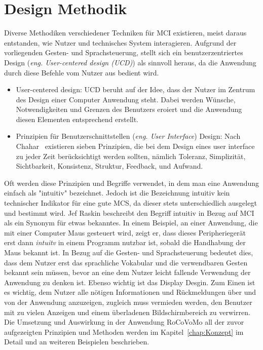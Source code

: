 \section{Design Methodik}
Diverse Methodiken verschiedener Techniken f\"ur \gls{MCI} existieren, meist daraus entstanden, wie Nutzer und technisches System interagieren. Aufgrund der vorliegenden Gesten- und Sprachsteuerung, stellt sich ein benutzerzentriertes Design (\textit{eng. User-centered design (UCD)}) als sinnvoll heraus, da die Anwendung durch diese Befehle vom Nutzer aus bedient wird.
\begin{itemize}
\item User-centered design: UCD beruht auf der Idee, dass der Nutzer im Zentrum des Design einer Computer Anwendung steht. Dabei werden W\"unsche, Notwendigkeiten und Grenzen des Benutzers eroiert und die Anwendung diesen Elementen entsprechend erstellt.
\item Prinzipien f\"ur Benutzerschnittstellen (\textit{eng. User Interface}) Design: Nach Chahar~\cite{bib:Chahar} existieren sieben Prinzipien, die bei dem Design eines user interface zu jeder Zeit ber\"ucksichtigt werden sollten, n\"amlich Toleranz, Simplizit\"at, Sichtbarkeit, Konsistenz, Struktur, Feedback, und Aufwand.
\end{itemize}
Oft werden diese Prinzipien und Begriffe verwendet, in dem man eine Anwendung einfach als "intuitiv" bezeichnet. Jedoch ist die Bezeichnung intuitiv kein technischer Indikator f\"ur eine gute \gls{MCS}, da dieser stets unterschiedlich ausgelegt und bestimmt wird. Jef Raskin \cite{bib:Raskin} beschreibt den Begriff intuitiv in Bezug auf \gls{MCI} als ein Synonym f\"ur etwas bekanntes. In einem Beispiel, an einer Anwendung, die mit einer Computer Maus gesteuert wird, zeigt er, dass dieses Peripherieger\"at erst dann \textit{intuitv} in einem Programm nutzbar ist, sobald die Handhabung der Maus bekannt ist. In Bezug auf die Gesten- und Sprachsteuerung bedeutet dies, dass dem Nutzer erst das sprachliche Vokabular und die verwendbaren Gesten bekannt sein m\"ussen, bevor an eine dem Nutzer leicht fallende Verwendung der Anwendung zu denken ist.
\newline
Ebenso wichtig ist das Display Desgin. Zum Einen ist es wichtig, dem Nutzer alle n\"otigen Informationen und R\"uckmeldungen \"uber und von der Anwendung anzuzeigen, zugleich muss vermieden werden, den Benutzer mit zu vielen Anzeigen und einem \"uberladenen Bildschirmbereich zu verwirren.
\newline
Die Umsetzung und Auswirkung in der Anwendung RoCoVoMo all der zuvor aufgezeigten Prinzipien und Methoden werden im Kapitel~\ref{chap:Konzept} im Detail und an weiteren Beispielen beschrieben.
